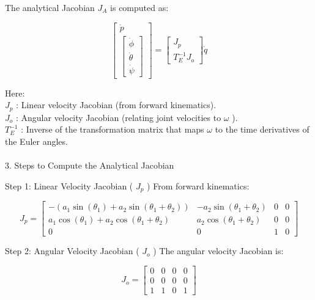 \documentclass[12pt]{report}
\begin{document}
The analytical Jacobian $J_A$ is computed as:

\begin{equation}
	\begin{bmatrix}
		\dot{p} \\
		\begin{bmatrix}
			\dot{\phi} \\
			\dot{\theta} \\
			\dot{\psi}
		\end{bmatrix}
	\end{bmatrix}
	=
	\begin{bmatrix}
		J_p \\
		T_E^{-1} J_o
	\end{bmatrix} \dot{q}
\end{equation}


Here:
\\$J_p$ : Linear velocity Jacobian (from forward kinematics).
\\$J_o$ : Angular velocity Jacobian (relating joint velocities to $\omega$ ).
\\$T_E^{-1}$ : Inverse of the transformation matrix that maps $\omega$ to the time derivatives of the Euler angles.
\\\\3. Steps to Compute the Analytical Jacobian

Step 1: Linear Velocity Jacobian ( $J_p$ )
From forward kinematics:

\begin{equation}
	J_p =
	\begin{bmatrix}
		-\left(a_1 \sin \left(\theta_1\right) + a_2 \sin \left(\theta_1 + \theta_2\right)\right) & -a_2 \sin \left(\theta_1 + \theta_2\right) & 0 & 0 \\
		a_1 \cos \left(\theta_1\right) + a_2 \cos \left(\theta_1 + \theta_2\right) & a_2 \cos \left(\theta_1 + \theta_2\right) & 0 & 0 \\
		0 & 0 & 1 & 0
	\end{bmatrix}
\end{equation}



Step 2: Angular Velocity Jacobian ( $J_o$ )
The angular velocity Jacobian is:

\begin{equation}
	J_o =
	\begin{bmatrix}
		0 & 0 & 0 & 0 \\
		0 & 0 & 0 & 0 \\
		1 & 1 & 0 & 1
	\end{bmatrix}
\end{equation}
\end{document}
